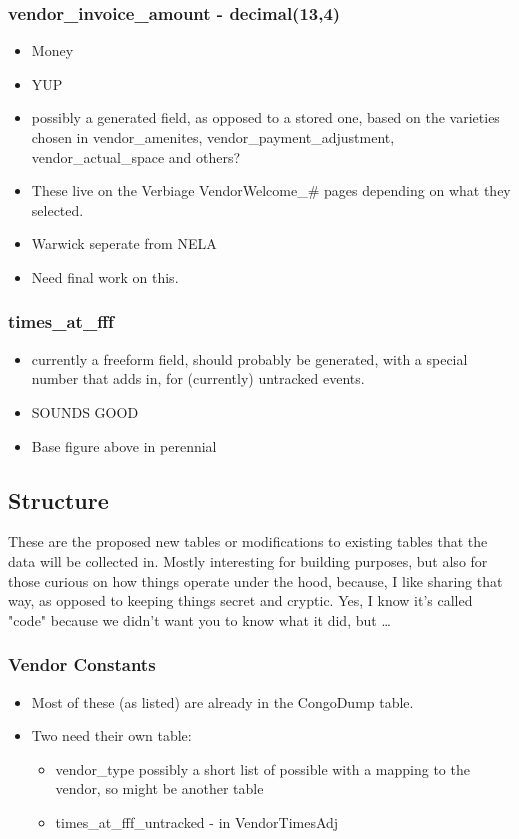 \documentclass[captions=tablesignature]{scrartcl}
\begin{document}
\subsubsection{vendor\_invoice\_amount - decimal(13,4)}
\label{sec-2-4-1}
\begin{itemize}
\item Money
\item YUP
\item possibly a generated field, as opposed to a stored one, based
on the varieties chosen in vendor\_amenites,
vendor\_payment\_adjustment, vendor\_actual\_space and others?
\item These live on the Verbiage VendorWelcome\_\# pages depending on
what they selected.
\item Warwick seperate from NELA
\item Need final work on this.
\end{itemize}

\subsubsection{times\_at\_fff}
\label{sec-2-4-2}
\begin{itemize}
\item currently a freeform field, should probably be generated, with a
special number that adds in, for (currently) untracked events.
\item SOUNDS GOOD
\item Base figure above in perennial
\end{itemize}

\subsection{Structure}
\label{sec-2-5}
These are the proposed new tables or modifications to existing
tables that the data will be collected in.  Mostly interesting for
building purposes, but also for those curious on how things operate
under the hood, because, I like sharing that way, as opposed to
keeping things secret and cryptic.  Yes, I know it's called "code"
because we didn't want you to know what it did, but \ldots{} 
\subsubsection{Vendor Constants}
\label{sec-2-5-1}
\begin{itemize}
\item Most of these (as listed) are already in the CongoDump table.
\item Two need their own table:
\begin{itemize}
\item vendor\_type
possibly a short list of possible with a mapping to the
vendor, so might be another table
\item times\_at\_fff\_untracked - in VendorTimesAdj
\end{itemize}
\end{itemize}
\end{document}
